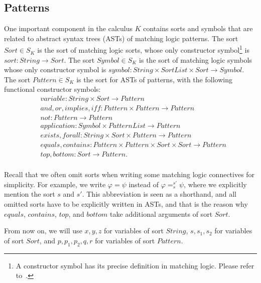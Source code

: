 \documentclass[UTF8]{article}
\theoremstyle{plain}
\theoremstyle{definition}
\theoremstyle{remark}
\begin{document}
\subsection{Patterns}
One important component in the calculus $K$ contains sorts and symbols that are related to abstract syntax trees (ASTs) of matching logic patterns. 
The sort $\mathit{Sort} \in S_K$ is the sort of matching logic sorts, whose only constructor symbol\footnote{A constructor symbol has its precise definition in matching logic. Please refer to~\cite{?}.} is $\mathit{sort} \colon \mathit{String} \to \mathit{Sort}$.
The sort $\mathit{Symbol} \in S_K$ is the sort of matching logic symbols whose
only constructor symbol is $\mathit{symbol} \colon \mathit{String} \times \mathit{SortList} \times \mathit{Sort} \to \mathit{Symbol}$. 
The sort $\mathit{Pattern} \in S_K$ is the sort for ASTs of patterns, with the 
following functional constructor symbols:
\begin{align*}
&\mathit{variable} \colon \mathit{String} \times \mathit{Sort} \to 
\mathit{Pattern} \\
&\mathit{and}, \mathit{or}, \mathit{implies}, \mathit{iff} \colon \mathit{Pattern} \times \mathit{Pattern} \to \mathit{Pattern} \\
&\mathit{not} \colon \mathit{Pattern} \to \mathit{Pattern} \\
&\mathit{application} \colon \mathit{Symbol} \times \mathit{PatternList} \to 
\mathit{Pattern} \\
&\mathit{exists}, \mathit{forall} \colon \mathit{String} \times 
\mathit{Sort} \times \mathit{Pattern} \to \mathit{Pattern} \\
&\mathit{equals}, \mathit{contains} \colon \mathit{Pattern} \times 
\mathit{Pattern} \times \mathit{Sort} \times \mathit{Sort} \to \mathit{Pattern} \\
&\mathit{top}, \mathit{bottom} \colon \mathit{Sort} \to \mathit{Pattern}. \\
\end{align*}

Recall that we often omit sorts when writing some matching logic connectives for simplicity.
For example, we write $\varphi = \psi$ instead of $\varphi =_{s}^{s'} \psi$, where we explicitly mention the sort $s$ and $s'$.
This abbreviation is seen as a shorthand, and all omitted sorts have to be explicitly written in ASTs, and that is the reason why $\mathit{equals}$, $\mathit{contains}$, $top$, and $bottom$ take additional arguments of sort $\mathit{Sort}$.

From now on, we will use $x, y, z$ for variables of sort $\mathit{String}$, $s, s_1, s_2$ for variables of sort $\mathit{Sort}$, and $p, p_1, p_2, q, r$ for variables of sort $\mathit{Pattern}$. 
\end{document}
